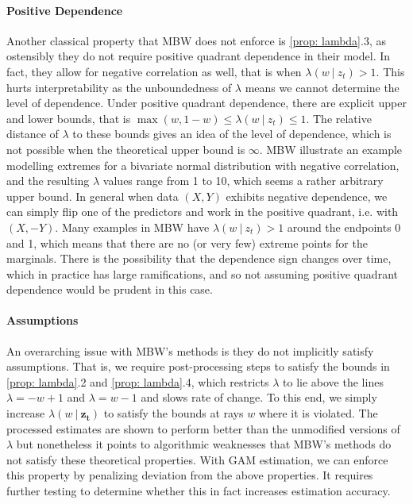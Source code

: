\documentclass[12pt]{article}
\begin{document}
    \paragraph{Positive Dependence} Another classical property that MBW does not enforce is \cref{prop: lambda}.3, as ostensibly they do not require positive quadrant dependence in their model.
    In fact, they allow for negative correlation as well, that is when $\lambda(w \ |\ z_t) > 1$.
    This hurts interpretability as the unboundedness of $\lambda$ means we cannot determine the level of dependence.
    Under positive quadrant dependence, there are explicit upper and lower bounds, that is $\max(w, 1 - w) \leq \lambda(w \ |\ z_t) \leq 1$. 
    The relative distance of $\lambda$ to these bounds gives an idea of the level of dependence, which is not possible when the theoretical upper bound is $\infty$.
    MBW illustrate an example modelling extremes for a bivariate normal distribution with negative correlation, and the resulting $\lambda$ values range from 1 to 10, which seems a rather arbitrary upper bound.
    In general when data $(X, Y)$ exhibits negative dependence, we can simply flip one of the predictors and work in the positive quadrant, i.e. with $(X, -Y)$.
    Many examples in MBW have $\lambda(w \ |\ z_t) > 1$ around the endpoints 0 and 1, which means that there are no (or very few) extreme points for the marginals.
    There is the possibility that the dependence sign changes over time, which in practice has large ramifications, and so not assuming positive quadrant dependence would be prudent in this case.

    \paragraph{Assumptions} An overarching issue with MBW's methods is they do not implicitly satisfy assumptions. That is, we require post-processing steps to satisfy the bounds in \cref{prop: lambda}.2 and \cref{prop: lambda}.4, which restricts $\lambda$ to lie above the lines $\lambda = -w + 1$ and $\lambda = w - 1$ and slows rate of change. To this end, we simply increase $\lambda(w \ |\ \boldsymbol{z_t})$ to satisfy the bounds at rays $w$ where it is violated. 
    The processed estimates are shown to perform better than the unmodified versions of $\lambda$ but nonetheless it points to algorithmic weaknesses that MBW's methods do not satisfy these theoretical properties. 
    With GAM estimation, we can enforce this property by penalizing deviation from the above properties.
    It requires further testing to determine whether this in fact increases estimation accuracy.
\end{document}
